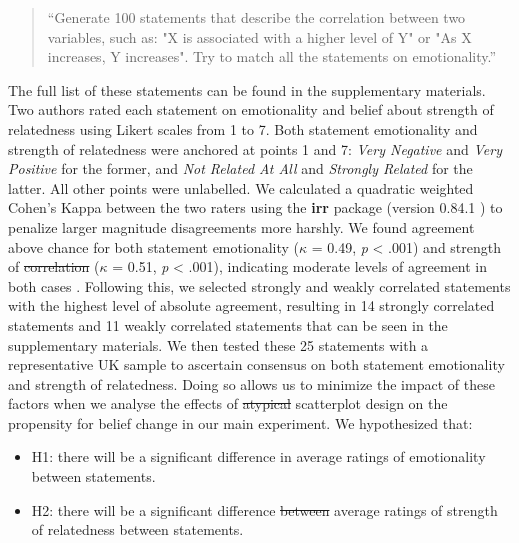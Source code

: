 \documentclass[manuscript,screen,review,anonymous]{acmart}
\providecommand{\tightlist}{%
  \setlength{\itemsep}{0pt}\setlength{\parskip}{0pt}}\usepackage{longtable,booktabs,array}
\providecommand{\DIFaddtex}[1]{{\protect\color{blue}\uwave{#1}}} %
\providecommand{\DIFdeltex}[1]{{\protect\color{red}\sout{#1}}} %
\providecommand{\DIFaddbegin}{} %
\providecommand{\DIFaddend}{} %
\providecommand{\DIFdelbegin}{} %
\providecommand{\DIFdelend}{} %
\providecommand{\DIFadd}[1]{\texorpdfstring{\DIFaddtex{#1}}{#1}} %
\providecommand{\DIFdel}[1]{\texorpdfstring{\DIFdeltex{#1}}{}} %
\newcommand{\DIFscaledelfig}{0.5}
\newlength{\DIFdelgraphicswidth} %
\newlength{\DIFdelgraphicsheight} %
\newcommand{\DIFaddincludegraphics}[2][]{{\color{blue}\fbox{\DIFOincludegraphics[#1]{#2}}}} %
\newcommand{\DIFdelincludegraphics}[2][]{%
\sbox{\DIFdelgraphicsbox}{\DIFOincludegraphics[#1]{#2}}%
\settoboxwidth{\DIFdelgraphicswidth}{\DIFdelgraphicsbox} %
\settoboxtotalheight{\DIFdelgraphicsheight}{\DIFdelgraphicsbox} %
\scalebox{\DIFscaledelfig}{%
\parbox[b]{\DIFdelgraphicswidth}{\usebox{\DIFdelgraphicsbox}\\[-\baselineskip] \rule{\DIFdelgraphicswidth}{0em}}\llap{\resizebox{\DIFdelgraphicswidth}{\DIFdelgraphicsheight}{%
\setlength{\unitlength}{\DIFdelgraphicswidth}%
\begin{picture}(1,1)%
\thicklines\linethickness{2pt} %
{\color[rgb]{1,0,0}\put(0,0){\framebox(1,1){}}}%
{\color[rgb]{1,0,0}\put(0,0){\line( 1,1){1}}}%
{\color[rgb]{1,0,0}\put(0,1){\line(1,-1){1}}}%
\end{picture}%
}\hspace*{3pt}}} %
} %
\DeclareRobustCommand{\DIFaddbegin}{\DIFOaddbegin \let\includegraphics\DIFaddincludegraphics} %
\DeclareRobustCommand{\DIFaddend}{\DIFOaddend \let\includegraphics\DIFOincludegraphics} %
\DeclareRobustCommand{\DIFdelbegin}{\DIFOdelbegin \let\includegraphics\DIFdelincludegraphics} %
\DeclareRobustCommand{\DIFdelend}{\DIFOaddend \let\includegraphics\DIFOincludegraphics} %
\begin{document}
\begin{quotation}
    ``Generate 100 statements that describe the correlation between two variables, such as:
     "X is associated with a higher level of Y" or
     "As X increases, Y increases".
    Try to match all the statements on emotionality.''

\end{quotation}

The full list of these statements can be found in the supplementary
materials. Two authors rated each statement on emotionality and belief
about strength of relatedness using Likert scales from 1 to 7. Both
statement emotionality and strength of relatedness were anchored at
points 1 and 7: \emph{Very Negative} and \emph{Very Positive} for the
former, and \emph{Not Related At All} and \emph{Strongly Related} for
the latter. All other points were unlabelled. We calculated a quadratic
weighted Cohen's Kappa between the two raters using the \textbf{irr}
package (version 0.84.1 \citep{irr}) to penalize larger magnitude
disagreements more harshly. We found agreement above chance for both
statement emotionality (\(\kappa\) = 0.49, \emph{p} \textless{} .001)
and strength of \DIFdelbegin \DIFdel{correlation }\DIFdelend \DIFaddbegin \DIFadd{relatedness }\DIFaddend (\(\kappa\) = 0.51, \emph{p} \textless{}
.001), indicating moderate levels of agreement in both cases
\citep{cohen_1968, fleiss_1969}. Following this, we selected strongly
and weakly correlated statements with the highest level of absolute
agreement, resulting in 14 strongly correlated statements and 11 weakly
correlated statements that can be seen in the supplementary materials.
We then tested these 25 statements with a representative UK sample to
ascertain consensus on both statement emotionality and strength of
relatedness. Doing so allows us to minimize the impact of these factors
when we analyse the effects of \DIFdelbegin \DIFdel{atypical }\DIFdelend \DIFaddbegin \DIFadd{alternative }\DIFaddend scatterplot design on the
propensity for belief change in our main experiment. We hypothesized
that:

\begin{itemize}
\tightlist
\item
  H1: there will be a significant difference in \DIFaddbegin \DIFadd{the }\DIFaddend average ratings of
  emotionality between statements.
\item
  H2: there will be a significant difference \DIFdelbegin \DIFdel{between }\DIFdelend \DIFaddbegin \DIFadd{in the }\DIFaddend average ratings of
  strength of relatedness between statements.
\end{itemize}
\end{document}
